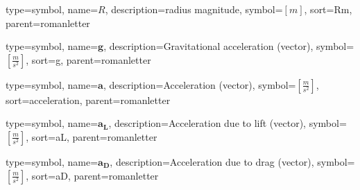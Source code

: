 {
type=symbol, %
name={\ensuremath{R}}, %
description={radius magnitude}, %
symbol={$\left[m\right]$}, %
sort=Rm, %
parent=romanletter %
}

{
type=symbol, %
name={\ensuremath{\mathbf{g}}}, %
description={Gravitational acceleration (vector)}, %
symbol={$\left[\frac{m}{s^2}\right]$}, %
sort=g, %
parent=romanletter %
}

{
type=symbol, %
name={\ensuremath{\mathbf{a}}}, %
description={Acceleration (vector)}, %
symbol={$\left[\frac{m}{s^2}\right]$}, %
sort=acceleration, %
parent=romanletter %
}

{
type=symbol, %
name={\ensuremath{\mathbf{a_L}}}, %
description={Acceleration due to lift (vector)}, %
symbol={$\left[\frac{m}{s^2}\right]$}, %
sort=aL, %
parent=romanletter %
}

{
type=symbol, %
name={\ensuremath{\mathbf{a_D}}}, %
description={Acceleration due to drag (vector)}, %
symbol={$\left[\frac{m}{s^2}\right]$}, %
sort=aD, %
parent=romanletter %
}

